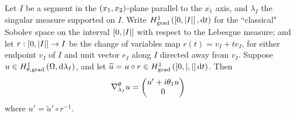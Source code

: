 \begin{lemma} \label{lem:TangentialQMGradientSegmentParallel}
	Let $I$ be a segment in the $\left( x_1,x_2 \right)$-plane parallel to the $x_1$ axis, and $\lambda_I$ the singular measure supported on $I$.
	Write $H^1_\mathrm{grad}\left( \left[ 0,\left\lvert I \right\rvert \right], \mathrm{d}t \right)$ for the ``classical" Sobolev space on the interval $\left[ 0,\left\lvert I \right\rvert \right]$ with respect to the Lebesgue measure; and let $r:\left[ 0,\left\lvert I \right\rvert \right]\rightarrow I$ be the change of variables map $r(t) = v_I + te_I$, for either endpoint $v_I$ of $I$ and unit vector $e_I$ along $I$ directed away from $v_I$.
	Suppose $u\in H^1_{\theta, \mathrm{grad}}\left( \Omega, \mathrm{d}\lambda_I \right)$, and let $\widetilde{u} = u\circ r\in H^1_\mathrm{grad}\left( \left[ 0,\left\lvert , \right\rvert \right] \mathrm{d}t \right)$.
	Then
	\begin{align*}
		\nabla_{\lambda_I}^\theta u &= \begin{pmatrix} u' + i\theta_1 u \\ 0	\end{pmatrix}
	\end{align*}
	where $u' = \widetilde{u}' \circ r^{-1}$.
\end{lemma}

